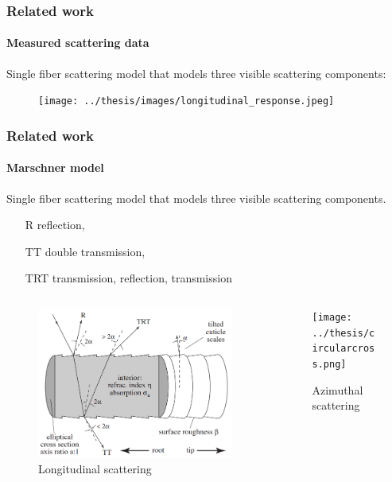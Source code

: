 \documentclass{beamer}
\begin{document}
  
  \begin{frame}
    \frametitle{Related work}
    \framesubtitle{Measured scattering data}
    Single fiber scattering model that models three visible scattering components:
    
    \begin{figure}
    \centering
    \texttt{[image: ../thesis/images/longitudinal\_response.jpeg]}
    \end{figure}
  \end{frame}
  
    \begin{frame}
    \frametitle{Related work}
    \framesubtitle{Marschner model}
    Single fiber scattering model that models three visible scattering components.
    \begin{itemize}
    \centering
    \item[R] reflection,
    \item[TT] double transmission,
    \item[TRT] transmission, reflection, transmission
    \end{itemize}
    
    \begin{columns}[onlytextwidth]
    \begin{column}{.45\textwidth}
    \begin{figure}
    	\includegraphics[scale=0.20]{../thesis/images/marschner_model_longitudinal.png}
    	\caption{Longitudinal scattering}
    \end{figure}
    \end{column}
    \hfill
    \begin{column}{.45\textwidth}
    \begin{figure}
    	\texttt{[image: ../thesis/circularcross.png]}
    	\caption{Azimuthal scattering}
    \end{figure}
    \end{column}
    \end{columns}
  \end{frame}
  
\end{document}
